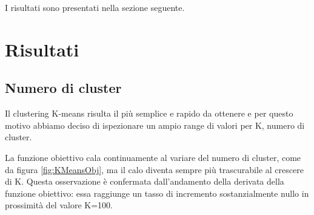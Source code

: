 \documentclass[
	11pt, %
	a4paper, %
	oneside, %
	headinclude,footinclude, %
	BCOR5mm, %
]{scrartcl}
\begin{document}
			\smallbreak
			I risultati sono presentati nella sezione seguente.

\section{Risultati}

	\subsection{Numero di cluster}
		Il clustering K-means risulta il più semplice e rapido da ottenere e per questo motivo abbiamo deciso di ispezionare un ampio range di valori per K, numero di cluster.

		La funzione obiettivo cala continuamente al variare del numero di cluster, come da figura \ref{fig:KMeansObj}, ma il calo diventa sempre più trascurabile al crescere di K.
		Questa osservazione è confermata dall'andamento della derivata della funzione obiettivo: essa raggiunge un tasso di incremento sostanzialmente nullo in prossimità del valore K=100.
\end{document}
